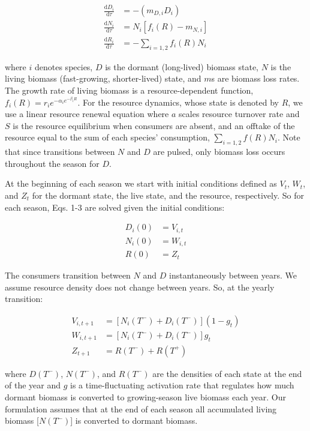 \documentclass[12pt,]{article}
\begin{document}
\begin{align}
\frac{\text{d}D_{i}}{\text{d}\tau} &= -(m_{D,i}D_{i})\\
\frac{\text{d}N_{i}}{\text{d}\tau} &= N_{i}[f_{i}(R) - m_{N,i}]\\
\frac{\text{d}R_{i}}{\text{d}\tau} &= - \sum\limits_{i=1,2}f_{i}(R)N_{i}
\end{align}

where $i$ denotes species, $D$ is the dormant (long-lived) biomass
state, $N$ is the living biomass (fast-growing, shorter-lived) state,
and $m$s are biomass loss rates. The growth rate of living biomass is a
resource-dependent function,
$f_{i}(R) = r_{i}e^{-\alpha_{i}e^{-\beta_{i}R}}$. For the resource
dynamics, whose state is denoted by $R$, we use a linear resource
renewal equation where $a$ scales resource turnover rate and $S$ is the
resource equilibrium when consumers are absent, and an offtake of the
resource equal to the sum of each species' consumption,
$\sum_{i=1,2}f(R)N_{i}$. Note that since transitions between $N$ and $D$
are pulsed, only biomass loss occurs throughout the season for $D$.

At the beginning of each season we start with initial conditions defined
as $V_{t}$, $W_{t}$, and $Z_{t}$ for the dormant state, the live state,
and the resource, respectively. So for each season, Eqs. 1-3 are solved
given the initial conditions:

\begin{align}
  D_{i}(0) &= V_{i,t} \\
  N_{i}(0) &= W_{i,t} \\
  R(0) &= Z_{t}
\end{align}

The consumers transition between $N$ and $D$ instantaneously between
years. We assume resource density does not change between years. So, at
the yearly transition:

\begin{align}
  V_{i,t+1} &= [N_{i}(T^-)+D_{i}(T^-)](1-g_{t}) \\
  W_{i,t+1} &= [N_{i}(T^-)+D_{i}(T^-)]g_{t} \\
  Z_{t+1} &= R(T^-) + R(T^+)
\end{align}

where $D(T^-)$, $N(T^-)$, and $R(T^-)$ are the densities of each state
at the end of the year and $g$ is a time-fluctuating activation rate
that regulates how much dormant biomass is converted to growing-season
live biomass each year. Our formulation assumes that at the end of each
season all accumulated living biomass {[}$N(T^-)${]} is converted to
dormant biomass.
\end{document}
